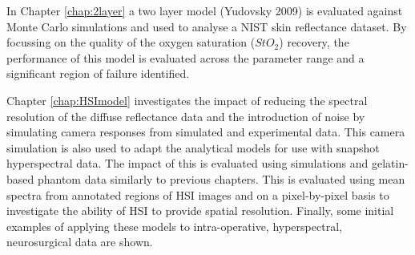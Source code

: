 In Chapter \ref{chap:2layer} a two layer model (Yudovsky 2009) is evaluated against Monte Carlo simulations and used to analyse a NIST skin reflectance dataset. By focussing on the quality of the oxygen saturation ($StO_2$) recovery, the performance of this model is evaluated across the parameter range and a significant region of failure identified. 

Chapter \ref{chap:HSImodel} investigates the impact of reducing the spectral resolution of the diffuse reflectance data and the introduction of noise by simulating camera responses from simulated and experimental data. This camera simulation is also used to adapt the analytical models for use with snapshot hyperspectral data. The impact of this is evaluated using simulations and gelatin-based phantom data similarly to previous chapters. This is evaluated using mean spectra from annotated regions of HSI images and on a pixel-by-pixel basis to investigate the ability of HSI to provide spatial resolution. Finally, some initial examples of applying these models to intra-operative, hyperspectral, neurosurgical data are shown. 